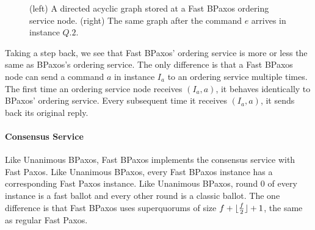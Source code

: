 \documentclass{mwhittaker}
\theoremstyle{definition}
\begin{document}
\begin{figure}[h]
  \centering

  \begin{subfigure}[b]{0.35\textwidth}
    \caption{}
  \end{subfigure}
  \begin{subfigure}[b]{0.35\textwidth}
    \caption{}
  \end{subfigure}

  \caption{%
    (left) A directed acyclic graph stored at a Fast BPaxos ordering service
    node. (right) The same graph after the command $e$ arrives in instance
    $Q.2$.
  }
\end{figure}

Taking a step back, we see that Fast BPaxos' ordering service is more or less
the same as BPaxos's ordering service. The only difference is that a Fast
BPaxos node can send a command $a$ in instance $I_a$ to an ordering service
multiple times. The first time an ordering service node receives $(I_a, a)$, it
behaves identically to BPaxos' ordering service. Every subsequent time it
receives $(I_a, a)$, it sends back its original reply.

\paragraph{Consensus Service}
Like Unanimous BPaxos, Fast BPaxos implements the consensus service with Fast
Paxos. Like Unanimous BPaxos, every Fast BPaxos instance has a corresponding
Fast Paxos instance. Like Unanimous BPaxos, round 0 of every instance is a
fast ballot and every other round is a classic ballot.
%
The one difference is that Fast BPaxos uses superquorums of size $f +
\lfloor\frac{f}{2}\rfloor + 1$, the same as regular Fast Paxos.
\end{document}
